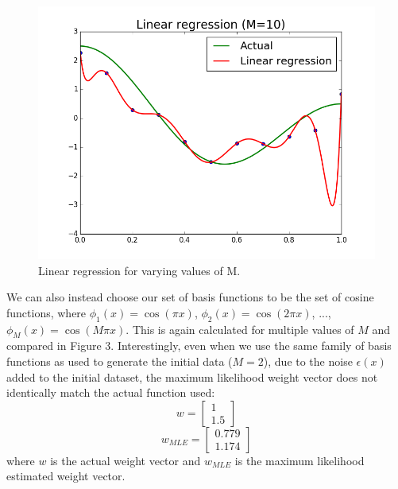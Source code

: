 \documentclass{article}
\begin{document}
\begin{figure}[width=\linewidth]
\begin{multicols}{2}
  \includegraphics[width=1.2\linewidth]{code/P2/linear_regression,10.png}
\end{multicols}
\caption{Linear regression for varying values of M.}
\end{figure}

We can also instead choose our set of basis functions to be the set of cosine functions, where $\phi_1(x) = \cos(\pi x)$, $\phi_2(x) = \cos(2 \pi x)$, ..., $\phi_M(x) = \cos(M \pi x)$. This is again calculated for multiple values of $M$ and compared in Figure 3. Interestingly, even when we use the same family of basis functions as used to generate the initial data ($M=2$), due to the noise $\epsilon(x)$ added to the initial dataset, the maximum likelihood weight vector does not identically match the actual function used:
$$ w =
\begin{bmatrix}
  1 \\
  1.5
\end{bmatrix}$$
$$ w_{MLE} =
\begin{bmatrix}
  0.779 \\
  1.174
\end{bmatrix}$$
where $w$ is the actual weight vector and $w_{MLE}$ is the maximum likelihood estimated weight vector.
\end{document}
